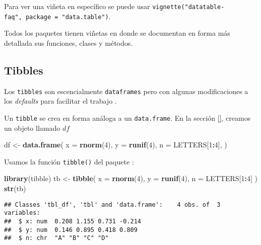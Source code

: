 \documentclass[]{article}
\newenvironment{Shaded}{\begin{snugshade}}{\end{snugshade}}
\newcommand{\KeywordTok}[1]{\textcolor[rgb]{0.13,0.29,0.53}{\textbf{#1}}}
\newcommand{\DataTypeTok}[1]{\textcolor[rgb]{0.13,0.29,0.53}{#1}}
\newcommand{\DecValTok}[1]{\textcolor[rgb]{0.00,0.00,0.81}{#1}}
\newcommand{\StringTok}[1]{\textcolor[rgb]{0.31,0.60,0.02}{#1}}
\newcommand{\OperatorTok}[1]{\textcolor[rgb]{0.81,0.36,0.00}{\textbf{#1}}}
\newcommand{\NormalTok}[1]{#1}
\begin{document}
Para ver una viñeta en específico se puede usar
\texttt{vignette("datatable-faq",\ package\ =\ "data.table")}.

\begin{curiosidad}[Viñetas]
Todos los paquetes tienen viñetas en donde se documentan en forma más detallada
sus funciones, clases y métodos.
\end{curiosidad}

\subsection{Tibbles}\label{tibbles}

Los \texttt{tibbles} son escencialmente \texttt{dataframes} pero con
algunas modificaciones a los \emph{defaults} para facilitar el trabajo
\parencite[][ver sección ``tibbles'']{wickham2016r}.

Un \texttt{tibble} se crea en forma análoga a un \texttt{data.frame}. En
la sección \ref{}, creamos un objeto llamado \(df\)

\begin{Shaded}
\begin{Highlighting}[]
\NormalTok{df <-}\StringTok{ }\KeywordTok{data.frame}\NormalTok{(}
  \DataTypeTok{x =} \KeywordTok{rnorm}\NormalTok{(}\DecValTok{4}\NormalTok{),}
  \DataTypeTok{y =} \KeywordTok{runif}\NormalTok{(}\DecValTok{4}\NormalTok{),}
  \DataTypeTok{n =}\NormalTok{ LETTERS[}\DecValTok{1}\OperatorTok{:}\DecValTok{4}\NormalTok{],}
\NormalTok{)}
\end{Highlighting}
\end{Shaded}

Usamos la función \texttt{tibble()} del paquete \textcite{tibble}:

\begin{Shaded}
\begin{Highlighting}[]
\KeywordTok{library}\NormalTok{(tibble)}
\NormalTok{tb <-}\StringTok{ }\KeywordTok{tibble}\NormalTok{(}
  \DataTypeTok{x =} \KeywordTok{rnorm}\NormalTok{(}\DecValTok{4}\NormalTok{),}
  \DataTypeTok{y =} \KeywordTok{runif}\NormalTok{(}\DecValTok{4}\NormalTok{),}
  \DataTypeTok{n =}\NormalTok{ LETTERS[}\DecValTok{1}\OperatorTok{:}\DecValTok{4}\NormalTok{]}
\NormalTok{)}
\KeywordTok{str}\NormalTok{(tb)}
\end{Highlighting}
\end{Shaded}

\begin{verbatim}
## Classes 'tbl_df', 'tbl' and 'data.frame':    4 obs. of  3 variables:
##  $ x: num  0.208 1.155 0.731 -0.214
##  $ y: num  0.146 0.895 0.418 0.809
##  $ n: chr  "A" "B" "C" "D"
\end{verbatim}
\end{document}
